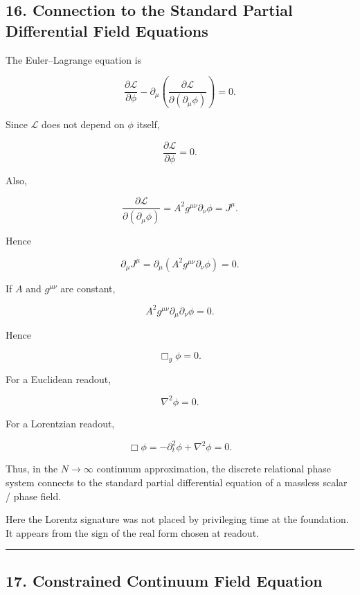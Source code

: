 \documentclass[
  a4paper,
]{article}
\begin{document}
\subsection{16. Connection to the Standard Partial Differential Field
Equations}\label{connection-to-the-standard-partial-differential-field-equations}

The Euler--Lagrange equation is

\[
\frac{\partial\mathcal L}{\partial\phi}
-
\partial_\mu
\left(
\frac{\partial\mathcal L}
{\partial(\partial_\mu\phi)}
\right)
=
0.
\tag{57}
\]

Since \(\mathcal L\) does not depend on \(\phi\) itself,

\[
\frac{\partial\mathcal L}{\partial\phi}=0.
\]

Also,

\[
\frac{\partial\mathcal L}
{\partial(\partial_\mu\phi)}
=
A^2g^{\mu\nu}\partial_\nu\phi
=
J^\mu.
\tag{58}
\]

Hence

\[
\boxed{
\partial_\mu J^\mu
=
\partial_\mu
\left(
A^2g^{\mu\nu}\partial_\nu\phi
\right)
=
0.
}
\tag{59}
\]

If \(A\) and \(g^{\mu\nu}\) are constant,

\[
A^2
g^{\mu\nu}
\partial_\mu\partial_\nu\phi
=
0.
\]

Hence

\[
\boxed{
\Box_g\phi=0.
}
\tag{60}
\]

For a Euclidean readout,

\[
\boxed{
\nabla^2\phi=0.
}
\tag{61}
\]

For a Lorentzian readout,

\[
\boxed{
\Box\phi
=
-\partial_t^2\phi
+
\nabla^2\phi
=
0.
}
\tag{62}
\]

Thus, in the \(N\to\infty\) continuum approximation, the discrete
relational phase system connects to the standard partial differential
equation of a massless scalar / phase field.

Here the Lorentz signature was not placed by privileging time at the
foundation. It appears from the sign of the real form chosen at readout.

\begin{center}\rule{0.5\linewidth}{0.5pt}\end{center}

\subsection{17. Constrained Continuum Field
Equation}\label{constrained-continuum-field-equation}
\end{document}
